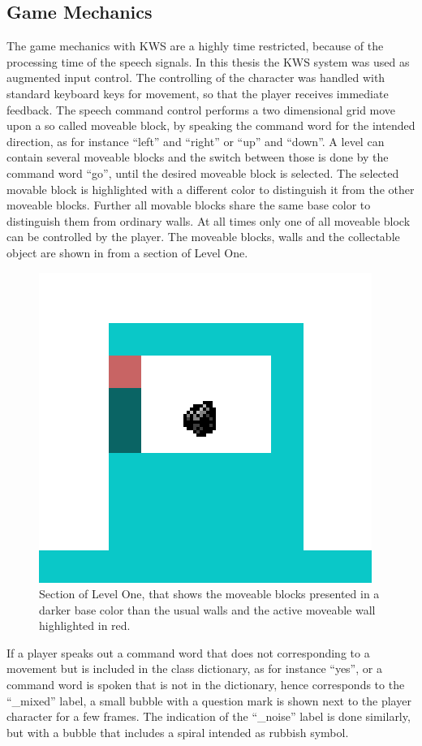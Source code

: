 
\subsection{Game Mechanics}\label{sec:game_design_mechanics}
The game mechanics with KWS are a highly time restricted, because of the processing time of the speech signals.
In this thesis the KWS system was used as augmented input control.
The controlling of the character was handled with standard keyboard keys for movement, so that the player receives immediate feedback. 
The speech command control performs a two dimensional grid move upon a so called moveable block, by speaking the command word for the intended direction, as for instance \enquote{left} and \enquote{right} or \enquote{up} and \enquote{down}.
A level can contain several moveable blocks and the switch between those is done by the command word \enquote{go}, until the desired moveable block is selected.
The selected movable block is highlighted with a different color to distinguish it from the other moveable blocks.
Further all movable blocks share the same base color to distinguish them from ordinary walls.
At all times only one of all moveable block can be controlled by the player.
The moveable blocks, walls and the collectable object are shown in  from a section of Level One.
\begin{figure}[!ht]
  \centering
  \includegraphics[height=0.25\textwidth]{./6_game/figs/game_design_mechanic_thing}
  \caption{Section of Level One, that shows the moveable blocks presented in a darker base color than the usual walls and the active moveable wall highlighted in red.}
  \label{fig:game_design_mechanic_thing}
\end{figure}
\FloatBarrier
\noindent
If a player speaks out a command word that does not corresponding to a movement but is included in the class dictionary, as for instance \enquote{yes}, or a command word is spoken that is not in the dictionary, hence corresponds to the \enquote{\_mixed} label, a small bubble with a question mark is shown next to the player character for a few frames.
The indication of the \enquote{\_noise} label is done similarly, but with a bubble that includes a spiral intended as rubbish symbol.
